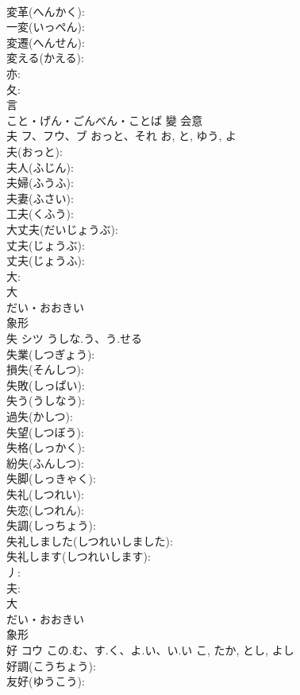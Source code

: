 \documentclass[8pt]{extreport}
\begin{document}
\begin{CJK}{UTF8}{min}
\\	変革(へんかく): 
\\	一変(いっぺん): 
\\	変遷(へんせん): 
\\	変える(かえる): 
\\	亦: 
\\	夂: 
\\	言	
\\	こと・げん・ごんべん・ことば	變	会意 
\\	夫	フ、フウ、ブ	おっと、それ	お, と, ゆう, よ	
\\	夫(おっと): 
\\	夫人(ふじん): 
\\	夫婦(ふうふ): 
\\	夫妻(ふさい): 
\\	工夫(くふう): 
\\	大丈夫(だいじょうぶ): 
\\	丈夫(じょうぶ): 
\\	丈夫(じょうふ): 
\\	大: 
\\	大	
\\	だい・おおきい	
\\	象形 
\\	失	シツ	うしな.う、う.せる		
\\	失業(しつぎょう): 
\\	損失(そんしつ): 
\\	失敗(しっぱい): 
\\	失う(うしなう): 
\\	過失(かしつ): 
\\	失望(しつぼう): 
\\	失格(しっかく): 
\\	紛失(ふんしつ): 
\\	失脚(しっきゃく): 
\\	失礼(しつれい): 
\\	失恋(しつれん): 
\\	失調(しっちょう): 
\\	失礼しました(しつれいしました): 
\\	失礼します(しつれいします): 
\\	丿: 
\\	夫: 
\\	大	
\\	だい・おおきい	
\\	象形 
\\	好	コウ	この.む、す.く、よ.い、い.い	こ, たか, とし, よし	
\\	好調(こうちょう): 
\\	友好(ゆうこう): 

\end{CJK}
\end{document}
